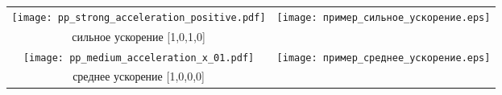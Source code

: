 \begin{frame}
\begin{columns}
\begin{column}{0.45\textwidth}
		\end{column}
		\hspace{-0.8cm}
		\begin{column}{0.55\textwidth}
			\centering
			\begin{tabular}{cc}
				\texttt{[image: pp\_strong\_acceleration\_positive.pdf]} &
				\texttt{[image: пример\_сильное\_ускорение.eps]}           \\
				\scriptsize сильное ускорение [1,0,1,0]                                     & \\
				\texttt{[image: pp\_medium\_acceleration\_x\_01.pdf]}     &
				\texttt{[image: пример\_среднее\_ускорение.eps]}           \\
				\scriptsize среднее ускорение [1,0,0,0]                                     & \\
			\end{tabular}
		\end{column}

	\end{columns}
\end{frame}

